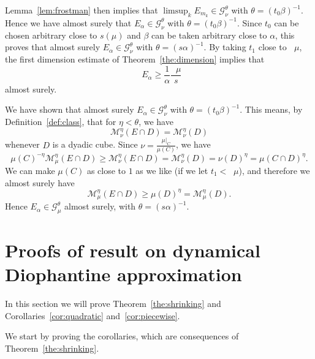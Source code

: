 \documentclass[AHL,Unicode,longabstracts]{cedram}
\DeclareMathOperator{\dimh}{dim_H}
\DeclareMathOperator{\ldimh}{\underline{dim}_H}
\DeclareMathOperator{\udimh}{\overline{dim}_H}
\newcommand*{\dimh}{\mathrm{dim}_{\mathrm{H}}}
\begin{document}
Lemma~\ref{lem:frostman} then implies that $\limsup_k E_{m_k} \in
\mathscr{G}_\nu^\theta$ with $\theta = (t_0 \beta)^{-1}$. Hence we have almost surely that $E_\alpha \in \mathscr{G}_\nu^\theta$ with $\theta = (t_0 \beta)^{-1}$. Since $t_0$ can be chosen arbitrary close to $s (\mu)$ and $\beta$ can be taken arbitrary close to $\alpha$, this proves that almost surely $E_\alpha \in
\mathscr{G}_\nu^\theta$ with $\theta = (s \alpha)^{-1}$. By taking $t_1$ close to $\udimh \mu$, the first dimension estimate of Theorem~\ref{the:dimension} implies that
\[
\dimh E_\alpha \geq \frac{1}{\alpha} \frac{\udimh \mu}{s}
\]
almost surely.

We have shown that almost surely $E_\alpha \in \mathscr{G}_\nu^\theta$ with $\theta = (t_0 \beta)^{-1}$. This means, by Definition~\ref{def:class}, that for $\eta < \theta$, we have
\[
\mathscr{M}_\nu^\eta (E \cap D) = \mathscr{M}_\nu^\eta (D)
\]
whenever $D$ is a dyadic cube. Since $\nu = \frac{\mu|_C}{\mu(C)}$, we have
\[
\mu (C)^{-\eta} \mathscr{M}_\mu^\eta (E \cap D) \geq \mathscr{M}_\nu^\eta (E \cap D) = \mathscr{M}_\nu^\eta (D) = \nu (D)^\eta = \mu(C \cap D)^\eta.
\]
We can make $\mu(C)$ as close to $1$ as we like (if we let $t_1 <
\ldimh \mu$), and therefore we almost surely have
\[
\mathscr{M}_\mu^\eta (E \cap D) \geq \mu(D)^\eta =
\mathscr{M}_\mu^\eta (D).
\]
Hence $E_\alpha \in \mathscr{G}_\mu^\theta$ almost surely, with $\theta = (s \alpha)^{-1}$.



\section{Proofs of result on dynamical Diophantine approximation} \label{sec:shrinkingproofs}

In this section we will prove Theorem~\ref{the:shrinking} and Corollaries~\ref{cor:quadratic} and~\ref{cor:piecewise}.

We start by proving the corollaries, which are consequences of Theorem~\ref{the:shrinking}.
\end{document}

